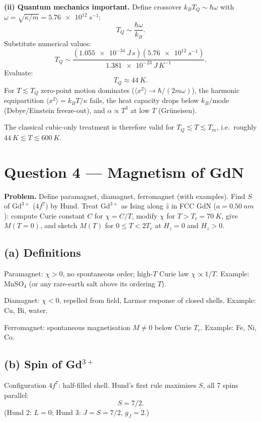 \documentclass[11pt]{article}
\begin{document}
\textbf{(ii) Quantum mechanics important.} Define crossover $k_BT_Q\sim\hbar\omega$ with $\omega = \sqrt{\kappa/m} = \SI{5.76e12}{s^{-1}}$:
\[
T_Q \sim \frac{\hbar\omega}{k_B}.
\]
Substitute numerical values:
\[
T_Q \sim \frac{(\SI{1.055e-34}{J\,s})(\SI{5.76e12}{s^{-1}})}{\SI{1.381e-23}{J\,K^{-1}}}.
\]
Evaluate:
\[
\boxed{\;T_Q \approx \SI{44}{K}.\;}
\]
For $T\lesssim T_Q$ zero-point motion dominates ($\langle x^2\rangle\to\hbar/(2m\omega)$), the harmonic equipartition $\langle x^2\rangle=k_BT/\kappa$ fails, the heat capacity drops below $k_B$/mode (Debye/Einstein freeze-out), and $\alpha\propto T^3$ at low $T$ (Gr\"uneisen).

The classical cubic-only treatment is therefore valid for $T_Q \lesssim T \lesssim T_m$, i.e.\ roughly $\SI{44}{K}\lesssim T\lesssim\SI{600}{K}$.

\section*{Question 4 --- Magnetism of GdN}

\textbf{Problem.} Define paramagnet, diamagnet, ferromagnet (with examples). Find $S$ of $\mathrm{Gd}^{3+}$ ($4f^7$) by Hund. Treat $\mathrm{Gd}^{3+}$ as Ising along $\hat z$ in FCC GdN ($a=\SI{0.50}{nm}$): compute Curie constant $C$ for $\chi=C/T$, modify $\chi$ for $T>T_c=\SI{70}{K}$, give $M(T=0)$, and sketch $M(T)$ for $0\le T<2T_c$ at $H_z=0$ and $H_z>0$.

\subsection*{(a) Definitions}

Paramagnet: $\chi>0$, no spontaneous order; high-$T$ Curie law $\chi\propto 1/T$. Example: MnSO$_4$ (or any rare-earth salt above its ordering $T$).

Diamagnet: $\chi<0$, repelled from field, Larmor response of closed shells. Example: Cu, Bi, water.

Ferromagnet: spontaneous magnetisation $M\neq 0$ below Curie $T_c$. Example: Fe, Ni, Co.

\subsection*{(b) Spin of Gd$^{3+}$}

Configuration $4f^7$: half-filled shell. Hund's first rule maximises $S$, all 7 spins parallel:
\[
\boxed{\;S = 7/2.\;}
\]
(Hund 2: $L=0$; Hund 3: $J=S=7/2$, $g_J = 2$.)
\end{document}
